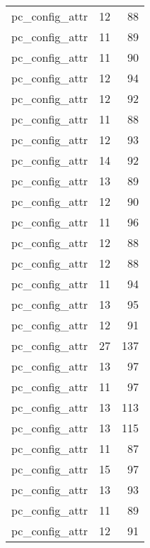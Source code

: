 \begin{table}
\begin{tabular}{lrr}
                  pc\_config\_attr &        12 &        88 \\
                  pc\_config\_attr &        11 &        89 \\
                  pc\_config\_attr &        11 &        90 \\
                  pc\_config\_attr &        12 &        94 \\
                  pc\_config\_attr &        12 &        92 \\
                  pc\_config\_attr &        11 &        88 \\
                  pc\_config\_attr &        12 &        93 \\
                  pc\_config\_attr &        14 &        92 \\
                  pc\_config\_attr &        13 &        89 \\
                  pc\_config\_attr &        12 &        90 \\
                  pc\_config\_attr &        11 &        96 \\
                  pc\_config\_attr &        12 &        88 \\
                  pc\_config\_attr &        12 &        88 \\
                  pc\_config\_attr &        11 &        94 \\
                  pc\_config\_attr &        13 &        95 \\
                  pc\_config\_attr &        12 &        91 \\
                  pc\_config\_attr &        27 &       137 \\
                  pc\_config\_attr &        13 &        97 \\
                  pc\_config\_attr &        11 &        97 \\
                  pc\_config\_attr &        13 &       113 \\
                  pc\_config\_attr &        13 &       115 \\
                  pc\_config\_attr &        11 &        87 \\
                  pc\_config\_attr &        15 &        97 \\
                  pc\_config\_attr &        13 &        93 \\
                  pc\_config\_attr &        11 &        89 \\
                  pc\_config\_attr &        12 &        91 \\

\end{tabular}
\end{table}
